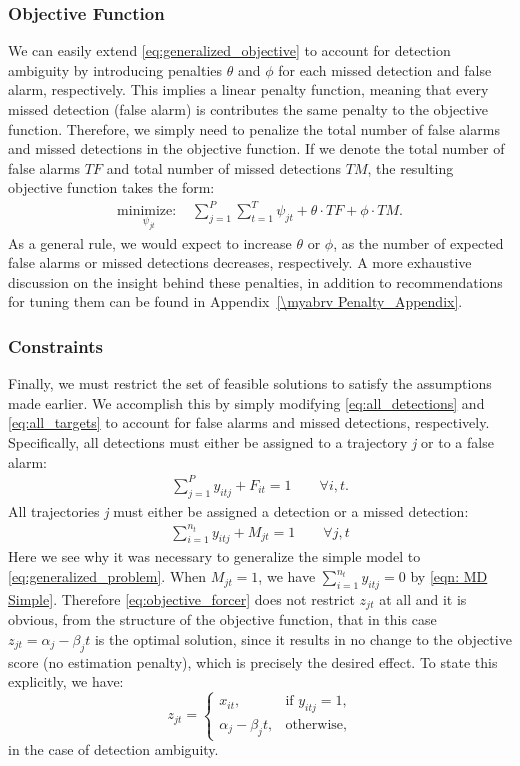 \subsubsection{Objective Function}
We can easily extend \eqref{eq:generalized_objective} to account for detection ambiguity by introducing penalties $\theta$ and $\phi$ for each missed detection and false alarm, respectively. This implies a linear penalty function, meaning that every missed detection (false alarm) is contributes the same penalty to the objective function. Therefore, we simply need to penalize the total number of false alarms and missed detections in the objective function. If we denote the total number of false alarms $TF$ and total number of missed detections $TM$, the resulting objective function takes the form:
\begin{align*}
\underset{\psi_{jt}}{\text{minimize: }} & \sum_{j=1}^{P} \sum_{t=1}^{T} \psi_{jt} + \theta \cdot TF + \phi \cdot TM.
\end{align*}
As a general rule, we would expect to increase $\theta$ or $\phi$, as the number of expected false alarms or missed detections decreases, respectively. A more exhaustive discussion on the insight behind these penalties, in addition to recommendations for tuning them can be found in Appendix~\ref{\myabrv Penalty_Appendix}.

\subsubsection{Constraints}
Finally, we must restrict the set of feasible solutions to satisfy the assumptions made earlier. We accomplish this by simply modifying \eqref{eq:all_detections} and \eqref{eq:all_targets} to account for false alarms and missed detections, respectively. Specifically, all detections must either be assigned to a trajectory \textit{j} or to a false alarm:
\begin{align}\label{eqn: FA Simple}
\sum_{j=1}^{P} y_{itj} + F_{it} = 1 \qquad \forall i,t.
\end{align}
All trajectories \textit{j} must either be assigned a detection or a missed detection:
\begin{align}\label{eqn: MD Simple}
\sum_{i=1}^{n_{t}} y_{itj} + M_{jt} = 1 \qquad \forall j,t
\end{align}
Here we see why it was necessary to generalize the simple model to \eqref{eq:generalized_problem}. When $M_{jt} = 1$, we have $\sum_{i=1}^{n_t} y_{itj} = 0$ by \eqref{eqn: MD Simple}. Therefore \eqref{eq:objective_forcer} does not restrict $z_{jt}$ at all and it is obvious, from the structure of the objective function, that in this case $z_{jt}=\alpha_{j} - \beta_{j}t$ is the optimal solution, since it results in no change to the objective score (no estimation penalty), which is precisely the desired effect. To state this explicitly, we have: 
\[z_{jt} =
\begin{cases}
x_{it}, & \text{if $y_{itj} = 1$,} \\
\alpha_{j} - \beta_{j}t, & \text{otherwise,}
\end{cases}\]
in the case of detection ambiguity. 

